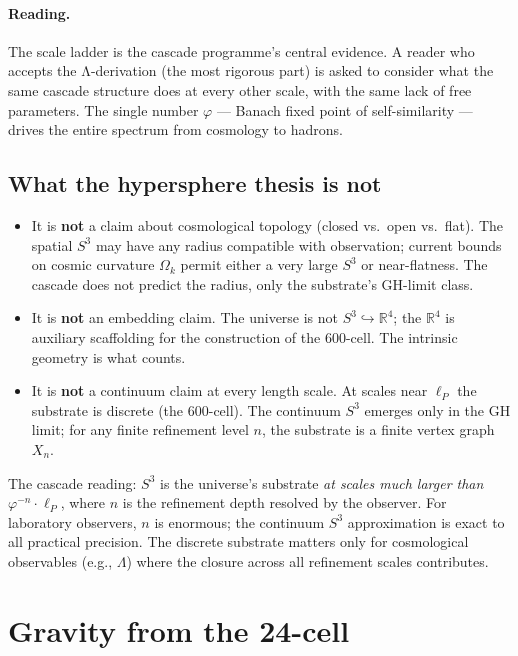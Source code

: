 \documentclass[11pt]{article}
\theoremstyle{plain}
\theoremstyle{definition}
\theoremstyle{remark}
\begin{document}
\paragraph{Reading.} The scale ladder is the cascade programme's central evidence. A reader who accepts the Λ-derivation (the most rigorous part) is asked to consider what the same cascade structure does at every other scale, with the same lack of free parameters. The single number $\varphi$ — Banach fixed point of self-similarity — drives the entire spectrum from cosmology to hadrons.

\subsection{What the hypersphere thesis is not}

\begin{itemize}[leftmargin=2em]
\item It is \textbf{not} a claim about cosmological topology (closed vs.\ open vs.\ flat). The spatial $S^3$ may have any radius compatible with observation; current bounds on cosmic curvature $\Omega_k$ permit either a very large $S^3$ or near-flatness. The cascade does not predict the radius, only the substrate's GH-limit class.
\item It is \textbf{not} an embedding claim. The universe is not $S^3 \hookrightarrow \mathbb{R}^4$; the $\mathbb{R}^4$ is auxiliary scaffolding for the construction of the 600-cell. The intrinsic geometry is what counts.
\item It is \textbf{not} a continuum claim at every length scale. At scales near $\ell_P$ the substrate is discrete (the 600-cell). The continuum $S^3$ emerges only in the GH limit; for any finite refinement level $n$, the substrate is a finite vertex graph $X_n$.
\end{itemize}

The cascade reading: $S^3$ is the universe's substrate \emph{at scales much larger than $\varphi^{-n} \cdot \ell_P$}, where $n$ is the refinement depth resolved by the observer. For laboratory observers, $n$ is enormous; the continuum $S^3$ approximation is exact to all practical precision. The discrete substrate matters only for cosmological observables (e.g., $\Lambda$) where the closure across all refinement scales contributes.

\section{Gravity from the 24-cell}\label{sec:gravity}
\end{document}
